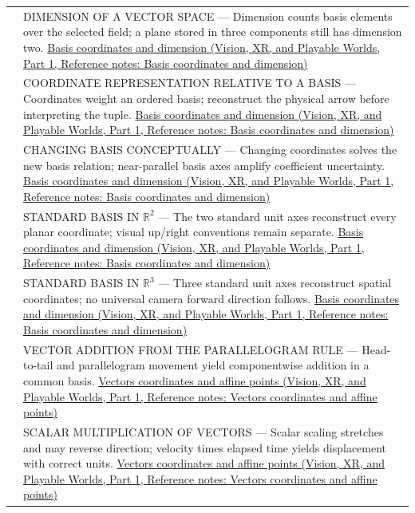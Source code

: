 {\begin{longtable}[]{@{}
  >{\raggedright\arraybackslash}p{}
  >{\raggedright\arraybackslash}p{}@{}}
513 & DIMENSION OF A VECTOR SPACE --- Dimension counts basis elements over the selected field; a plane stored in three components still has dimension two. \href{../07-Vision-XR-and-Playable-Worlds-P01/main.pdf\#nameddest=appendix-ce0341f7ea0d}{Basis coordinates and dimension (Vision, XR, and Playable Worlds, Part 1, Reference notes: Basis coordinates and dimension)} \\
514 & COORDINATE REPRESENTATION RELATIVE TO A BASIS --- Coordinates weight an ordered basis; reconstruct the physical arrow before interpreting the tuple. \href{../07-Vision-XR-and-Playable-Worlds-P01/main.pdf\#nameddest=appendix-ce0341f7ea0d}{Basis coordinates and dimension (Vision, XR, and Playable Worlds, Part 1, Reference notes: Basis coordinates and dimension)} \\
515 & CHANGING BASIS CONCEPTUALLY --- Changing coordinates solves the new basis relation; near-parallel basis axes amplify coefficient uncertainty. \href{../07-Vision-XR-and-Playable-Worlds-P01/main.pdf\#nameddest=appendix-ce0341f7ea0d}{Basis coordinates and dimension (Vision, XR, and Playable Worlds, Part 1, Reference notes: Basis coordinates and dimension)} \\
516 & STANDARD BASIS IN \(\mathbb R^2\) --- The two standard unit axes reconstruct every planar coordinate; visual up/right conventions remain separate. \href{../07-Vision-XR-and-Playable-Worlds-P01/main.pdf\#nameddest=appendix-ce0341f7ea0d}{Basis coordinates and dimension (Vision, XR, and Playable Worlds, Part 1, Reference notes: Basis coordinates and dimension)} \\
517 & STANDARD BASIS IN \(\mathbb R^3\) --- Three standard unit axes reconstruct spatial coordinates; no universal camera forward direction follows. \href{../07-Vision-XR-and-Playable-Worlds-P01/main.pdf\#nameddest=appendix-ce0341f7ea0d}{Basis coordinates and dimension (Vision, XR, and Playable Worlds, Part 1, Reference notes: Basis coordinates and dimension)} \\
518 & VECTOR ADDITION FROM THE PARALLELOGRAM RULE --- Head-to-tail and parallelogram movement yield componentwise addition in a common basis. \href{../07-Vision-XR-and-Playable-Worlds-P01/main.pdf\#nameddest=appendix-0659864c0aa3}{Vectors coordinates and affine points (Vision, XR, and Playable Worlds, Part 1, Reference notes: Vectors coordinates and affine points)} \\
519 & SCALAR MULTIPLICATION OF VECTORS --- Scalar scaling stretches and may reverse direction; velocity times elapsed time yields displacement with correct units. \href{../07-Vision-XR-and-Playable-Worlds-P01/main.pdf\#nameddest=appendix-0659864c0aa3}{Vectors coordinates and affine points (Vision, XR, and Playable Worlds, Part 1, Reference notes: Vectors coordinates and affine points)} \\

\end{longtable}}
